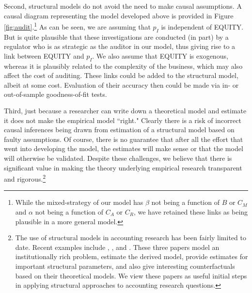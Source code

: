 Second, structural models do not avoid the need to make causal assumptions.
A causal diagram representing the model developed above is provided in Figure \ref{fig:audit}.\footnote{
While the mixed-strategy of our model has $\beta$ not being a function of $B$ or $C_M$ and $\alpha$ not being a function of $C_A$ or $C_R$, we have retained these links as being plausible in a more general model.}
As can be seen, we are assuming that $p_I$ is independent of EQUITY. 
But is quite plausible that these investigations are conducted (in part) by a regulator who is as strategic as the auditor in our model, thus giving rise to a link between EQUITY and $p_I$.
We also assume that EQUITY is exogenous, whereas it is plausibly related to the complexity of the business, which may also affect the cost of auditing.
These links could be added to the structural model, albeit at some cost.
Evaluation of their accuracy then could be made via in- or out-of-sample goodness-of-fit tests.

Third, just because a researcher can write down a theoretical model and estimate it does not make the empirical model ``right."
Clearly there is a risk of incorrect causal inferences being drawn from estimation of a structural model based on faulty assumptions.
Of course, there is no guarantee that after all the effort that went into developing the model, the estimates will make sense or that the model will otherwise be validated.
Despite these challenges, we believe that there is significant value in making the theory underlying empirical research transparent and rigorous.\footnote{The use of structural models in accounting research has been fairly limited to date.  
Recent examples include \citet{Gerakos:2013cl}, \citet{Zakolyukina:2015aa}, and \citet{Bertomeu:2015aa}.  
These three papers model an institutionally rich problem, estimate the derived model, provide estimates for important structural parameters, and also give interesting counterfactuals based on their theoretical models. 
We view these papers as useful initial steps in applying structural approaches to accounting research questions.}

